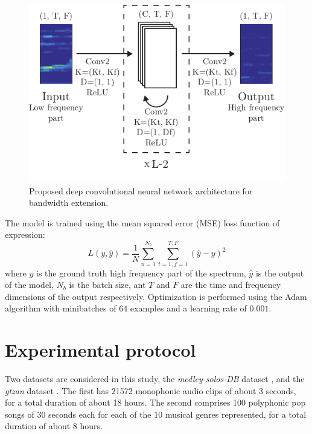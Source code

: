 \documentclass{article}
\begin{document}
\begin{figure}[t]
    \centering
    \includegraphics[width=\columnwidth]{figures/mdl.pdf}
    \caption{Proposed deep convolutional neural network architecture for bandwidth extension.}\label{fig:mdl}
\end{figure}

The model is trained using the mean squared error (MSE) loss function of expression:
\begin{equation}
L(y, \hat y) = \frac{1}{N}\sum\limits_{n=1}^{N_b}\sum\limits_{t=1, f=1}^{T, F}(\hat y - y)^2
\end{equation}
where $y$ is the ground truth high frequency part of the spectrum, $\hat y$ is the output of the model, $N_b$ is the batch size, ant $T$ and $F$ are the time and frequency dimensions of the output respectively. Optimization is performed using the Adam \cite{kingma2014adam} algorithm with minibatches of $64$ examples and a learning rate of $0.001$.


\section{Experimental protocol}
\label{sec:protocol}

Two datasets are considered in this study, the \textit{medley-solos-DB} dataset \cite{lostanlen2016deep}, and the \textit{gtzan} dataset \cite{tzanetakis2002musical}. The first has 21572 monophonic audio clips of about 3 seconds, for a total duration of about 18 hours. The second comprises 100 polyphonic pop songs of 30 seconds each for each of the 10 musical genres represented, for a total duration of about 8 hours.
\end{document}
